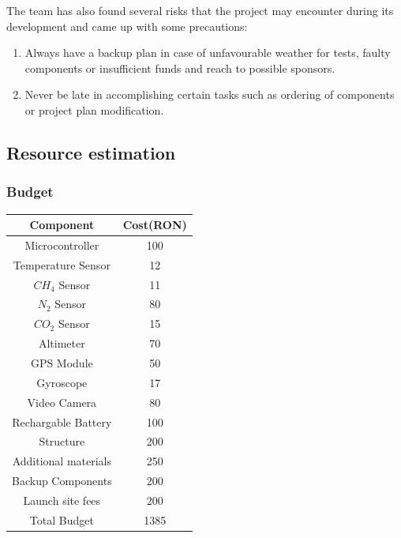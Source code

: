 \documentclass[11pt]{article}
\begin{document}
\hspace{0.5cm} The team has also found several risks that the project may encounter during its development and came up with some precautions:

\begin{enumerate}
\item Always have a backup plan in case of unfavourable weather for tests, faulty components or insufficient funds and reach to possible sponsors.
\item Never be late in accomplishing certain tasks such as ordering of components or project plan modification.
\end{enumerate}

\subsection{Resource estimation}

\subsubsection{Budget}
\begin{center}
	\begin{tabular}{|c|c|}
		\hline
		  Component & Cost(RON) \\
		\hline
		  Microcontroller & 100\\
		  Temperature Sensor & 12\\
		  $CH_4$ Sensor & 11\\
		  $N_2$ Sensor & 80\\
		  $CO_2$ Sensor & 15\\
		  Altimeter & 70\\
		  GPS Module & 50\\
		  Gyroscope & 17\\
		  Video Camera & 80\\
		  Rechargable Battery & 100\\
		  Structure & 200\\
		  Additional materials & 250\\
		  Backup Components & 200\\
		  Launch site fees & 200\\
		\hline
		  Total Budget & 1385\\
		\hline
           \end{tabular}
\end{center}
\end{document}
